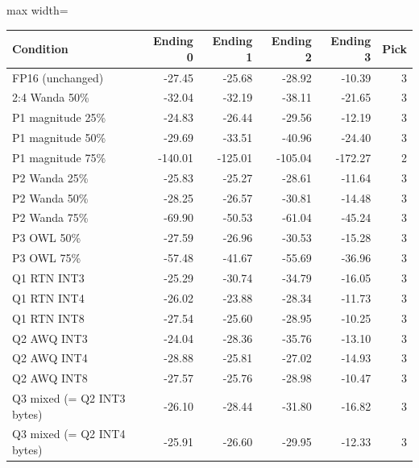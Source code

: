 \scriptsize
\setlength{\tabcolsep}{3.5pt}
\label{tab:t1qual}
\begin{adjustbox}{max width=\linewidth}
\begin{tabular}{lrrrrr}
\toprule
Condition & Ending 0 & Ending 1 & Ending 2 & Ending 3 & Pick \\
\midrule
FP16 (unchanged) & -27.45 & -25.68 & -28.92 & -10.39 & 3 \\
2:4 Wanda 50\% & -32.04 & -32.19 & -38.11 & -21.65 & 3 \\
P1 magnitude 25\% & -24.83 & -26.44 & -29.56 & -12.19 & 3 \\
P1 magnitude 50\% & -29.69 & -33.51 & -40.96 & -24.40 & 3 \\
P1 magnitude 75\% & -140.01 & -125.01 & -105.04 & -172.27 & 2 \\
P2 Wanda 25\% & -25.83 & -25.27 & -28.61 & -11.64 & 3 \\
P2 Wanda 50\% & -28.25 & -26.57 & -30.81 & -14.48 & 3 \\
P2 Wanda 75\% & -69.90 & -50.53 & -61.04 & -45.24 & 3 \\
P3 OWL 50\% & -27.59 & -26.96 & -30.53 & -15.28 & 3 \\
P3 OWL 75\% & -57.48 & -41.67 & -55.69 & -36.96 & 3 \\
Q1 RTN INT3 & -25.29 & -30.74 & -34.79 & -16.05 & 3 \\
Q1 RTN INT4 & -26.02 & -23.88 & -28.34 & -11.73 & 3 \\
Q1 RTN INT8 & -27.54 & -25.60 & -28.95 & -10.25 & 3 \\
Q2 AWQ INT3 & -24.04 & -28.36 & -35.76 & -13.10 & 3 \\
Q2 AWQ INT4 & -28.88 & -25.81 & -27.02 & -14.93 & 3 \\
Q2 AWQ INT8 & -27.57 & -25.76 & -28.98 & -10.47 & 3 \\
Q3 mixed (= Q2 INT3 bytes) & -26.10 & -28.44 & -31.80 & -16.82 & 3 \\
Q3 mixed (= Q2 INT4 bytes) & -25.91 & -26.60 & -29.95 & -12.33 & 3 \\
\bottomrule
\end{tabular}
\end{adjustbox}
